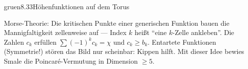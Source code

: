 \begin{loesungkarte}{gruen}{8.33}{Höhenfunktionen auf dem Torus}
\begin{mitnehmen}\kastentext
Morse-Theorie: Die kritischen Punkte einer generischen Funktion bauen die Mannigfaltigkeit zellenweise auf --- Index $k$ heißt \enquote{eine $k$-Zelle ankleben}. Die Zahlen $c_k$ erfüllen $\sum(-1)^{k}c_k = \chi$ und $c_k\ge b_k$. Entartete Funktionen (Symmetrie!) stören das Bild nur scheinbar: Kippen hilft. Mit dieser Idee bewies Smale die Poincaré-Vermutung in Dimension $\ge5$.
\end{mitnehmen}
\end{loesungkarte}

